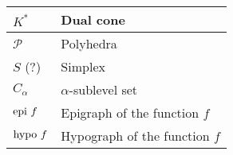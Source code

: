 \begin{xltabular}{\textwidth}{XX}
	\(K^*\) \cite[sec. 2.6]{boydConvexOptimization2004}                                                                                                                  & Dual cone                                                                                                                                                                                                      \\ \hline
	\(\mathcal{P}\) \cite[sec. 2.2.4]{boydConvexOptimization2004}                                                                                                          & Polyhedra                                                                                                                                                                                                      \\ \hline
	\(S\) (?)                                                                                                                    & Simplex                                                                                                                                                                                                        \\ \hline
	\(C_\alpha\) \cite[sec. 3.1.6]{boydConvexOptimization2004}                                                                                                             & \(\alpha\)-sublevel set                                                                                                                                                                                        \\ \hline
	\(\textnormal{epi } f\)  \cite[sec. 3.1.7]{boydConvexOptimization2004}                                                                                                  & Epigraph of the function \(f\)                                                                                                                                                                                 \\ \hline
	\(\textnormal{hypo } f\) \cite[sec 3.1.7]{boydConvexOptimization2004}                                                                                                 & Hypograph of the function \(f\)
\end{xltabular}

